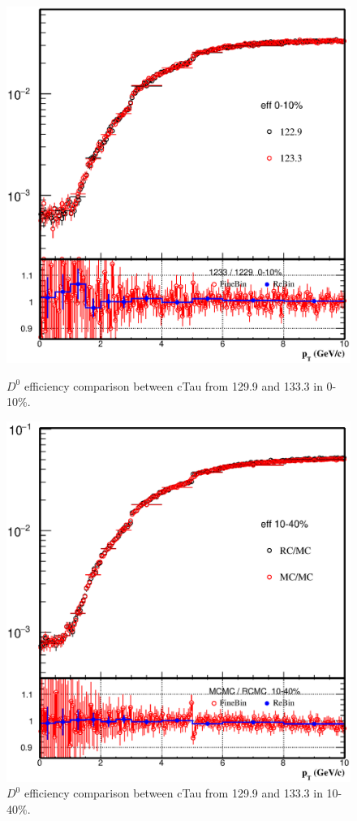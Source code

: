 \begin{figure}[htbp]
\begin{minipage}[htbp]{0.52\linewidth}
\centering
\includegraphics[width=1.0\textwidth]{figure/Run14_D0HFT/D0_eff_1233_0_10.eps}
\caption{$D^{0}$ efficiency comparison between cTau from 129.9 and 133.3 in 0-10\%. \label{fig:D0_eff_1233_0_10}}
\end{minipage}
\hfill
\begin{minipage}[htbp]{0.52\linewidth}
\centering
\includegraphics[width=1.0\textwidth]{figure/Run14_D0HFT/D0_eff_forMCRC_10_40.eps} 
\caption{$D^{0}$ efficiency comparison between cTau from 129.9 and 133.3 in 10-40\%. \label{fig:D0_eff_1233_0_10}}
\end{minipage}
\end{figure}

